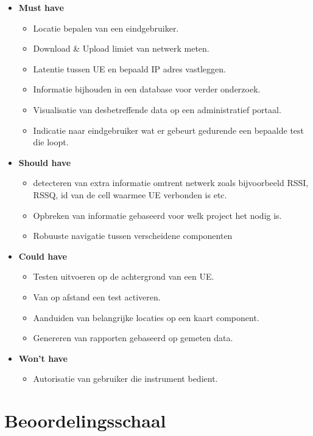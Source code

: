 \begin{itemize}
    \item \textbf{Must have}
    \begin{itemize}
        \item Locatie bepalen van een eindgebruiker.
        \item Download \& Upload limiet van netwerk meten.
        \item Latentie tussen UE en bepaald IP adres vastleggen.
        \item Informatie bijhouden in een database voor verder onderzoek.
        \item Visualisatie van desbetreffende data op een administratief portaal.
        \item Indicatie naar eindgebruiker wat er gebeurt gedurende een bepaalde test die loopt.
    \end{itemize}
    \item \textbf{Should have}
    \begin{itemize}
        \item detecteren van extra informatie omtrent netwerk zoals bijvoorbeeld RSSI, RSSQ, id van de cell waarmee UE verbonden is etc.
        \item Opbreken van informatie gebaseerd voor welk project het nodig is.
        \item Robuuste navigatie tussen verscheidene componenten
    \end{itemize}
    \item \textbf{Could have}
    \begin{itemize}
        \item Testen uitvoeren op de achtergrond van een UE.
        \item Van op afstand een test activeren.
        \item Aanduiden van belangrijke locaties op een kaart component.
        \item Genereren van rapporten gebaseerd op gemeten data.
    \end{itemize}
    \item \textbf{Won't have}
    \begin{itemize}
        \item Autorisatie van gebruiker die instrument bedient.
    \end{itemize}
\end{itemize}

\section{Beoordelingsschaal}

